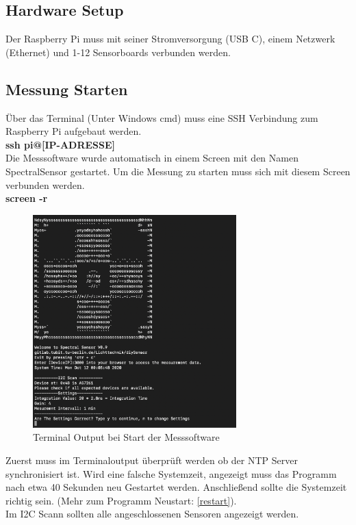 \subsection{Hardware Setup}
Der Raspberry Pi muss mit seiner Stromversorgung (USB C), einem  Netzwerk (Ethernet) und 1-12 Sensorboards verbunden werden.
\subsection{Messung Starten}
Über das Terminal (Unter Windows cmd) muss eine SSH Verbindung zum Raspberry Pi aufgebaut werden.\\
\textbf{ssh pi@[IP-ADRESSE]}\\
Die Messsoftware wurde automatisch in einem Screen mit den Namen SpectralSensor gestartet. Um die Messung zu starten muss sich mit diesem Screen verbunden werden.\\
\textbf{screen -r}\\
\begin{figure}[H]
\centering
\includegraphics[width=0.7\textwidth]{img/handbuch/check_settings}
\caption{Terminal Output bei Start der Messsoftware }
\label{fig:Start-der-Messsoftware}
\end{figure}
\noindent Zuerst muss im Terminaloutput überprüft werden ob der NTP Server synchronisiert ist.
Wird eine falsche Systemzeit, angezeigt muss das Programm nach etwa 40 Sekunden neu Gestartet werden. Anschließend sollte die Systemzeit richtig sein. (Mehr zum Programm Neustart: \ref{restart}).\\
Im I2C Scann sollten alle angeschlossenen Sensoren angezeigt werden.\\
